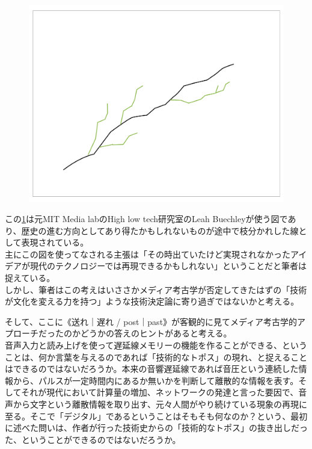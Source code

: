 \documentclass[a4paper,report]{jsbook}
\begin{document}
\begin{figure}[htbp]
\centering
\includegraphics[width=1.00000\textwidth]{./img/leah_sideway.jpg}
\caption{\label{fig:leah}}
\end{figure}

\autocite{leah:slide}

この\cref{fig:leah}は元MIT Media labのHigh low
tech研究室のLeah
Buechleyが使う図であり、歴史の進む方向としてあり得たかもしれないものが途中で枝分かれした線として表現されている。\\
主にこの図を使ってなされる主張は「その時出ていたけど実現されなかったアイデアが現代のテクノロジーでは再現できるかもしれない」ということだと筆者は捉えている。\\
しかし、筆者はこの考えはいささかメディア考古学が否定してきたはずの「技術が文化を変える力を持つ」ような技術決定論に寄り過ぎではないかと考える。

そして、ここに《送れ｜遅れ /
post｜past》が客観的に見てメディア考古学的アプローチだったのかどうかの答えのヒントがあると考える。\\
音声入力と読み上げを使って遅延線メモリーの機能を作ることができる、ということは、何か言葉を与えるのであれば「技術的なトポス」の現れ、と捉えることはできるのではないだろうか。本来の音響遅延線であれば音圧という連続した情報から、パルスが一定時間内にあるか無いかを判断して離散的な情報を表す。そしてそれが現代において計算量の増加、ネットワークの発達と言った要因で、音声から文字という離散情報を取り出す、元々人間がやり続けている現象の再現に至る。そこで「デジタル」であるということはそもそも何なのか？という、最初に述べた問いは、作者が行った技術史からの「技術的なトポス」の抜き出しだった、ということができるのではないだろうか。
\end{document}
